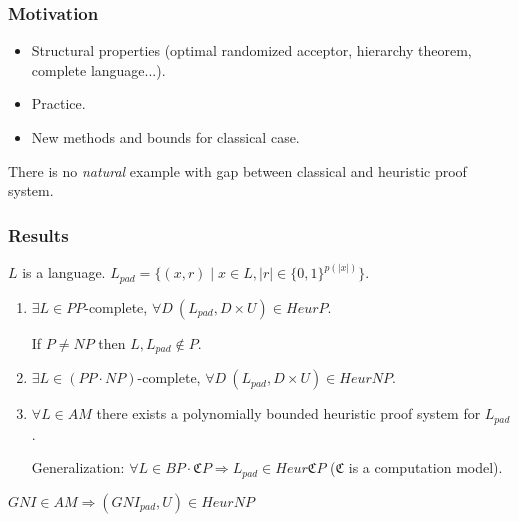 \begin{frame}
    \frametitle{Motivation}

    \pause
    \begin{itemize}
	    \item Structural properties (optimal randomized acceptor,
		    hierarchy theorem, complete language...).
        \pause
    	\item Practice.
    	\pause
        \item New methods and bounds for classical case.
    \end{itemize}

    \begin{statement}
        There is no {\it natural} example with gap between classical and heuristic proof system.
    \end{statement}
\end{frame}

\begin{frame}
    \frametitle{Results}

    $L$ is a language.
    $L_{pad} = \{(x, r) \mid x \in L, |r| \in \{0, 1 \}^{p(|x|)}\}$.
    
    \pause
    \begin{enumerate}
		\item $\exists L \in PP$-complete, $\forall D~
    		(L_{pad}, D \times U) \in HeurP$.

            \pause
            If $P \neq NP$ then $L, L_{pad} \notin P$.
    	\pause
    	\item $\exists L \in (PP \cdot NP)$-complete, $\forall D~
		    (L_{pad}, D \times U) \in HeurNP$.

    	\pause
    	\item $\forall L \in AM$ there exists a polynomially bounded
    		heuristic proof system for $L_{pad}$.

            \pause
            
            \vspace{0.5cm}
            Generalization:
		    $\forall L \in BP \cdot \mathfrak{C}P \Rightarrow L_{pad}
            \in Heur\mathfrak{C}P$ ($\mathfrak{C}$ is a computation
            model).    
    \end{enumerate}

    \pause
    \begin{example}
        $GNI \in AM \Rightarrow (GNI_{pad}, U) \in HeurNP$
    \end{example}
\end{frame}

